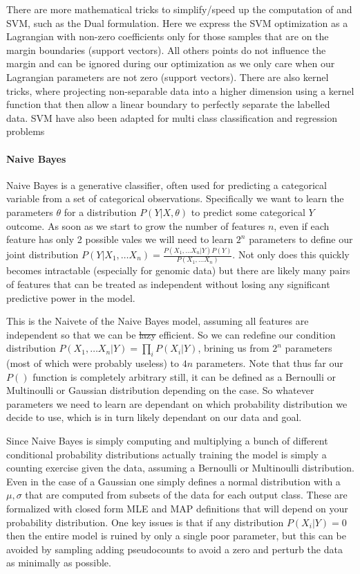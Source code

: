 There are more mathematical tricks to simplify/speed up the computation of and SVM, such as the Dual formulation.
Here we express the SVM optimization as a Lagrangian with non-zero coefficients only for those samples that are on the margin boundaries (support vectors).
All others points do not influence the margin and can be ignored during our optimization as we only care when our Lagrangian parameters are not zero (support vectors).
There are also kernel tricks, where projecting non-separable data into a higher dimension using a kernel function that then allow a linear boundary to perfectly separate the labelled data.
SVM have also been adapted for multi class classification and regression problems

\paragraph{Naive Bayes}
Naive Bayes is a generative classifier, often used for predicting a categorical variable from a set of categorical observations.
Specifically we want to learn the parameters $\theta$ for a distribution $P(Y|X,\theta)$ to predict some categorical $Y$ outcome.
As soon as we start to grow the number of features $n$, even if each feature has only 2 possible vales we will need to learn $2^n$ parameters to define our joint distribution $P(Y|X_1,\dots X_n) = \frac{P(X_1,\dots X_n|Y)P(Y)}{P(X_1,\dots X_n)}$.
Not only does this quickly becomes intractable (especially for genomic data) but there are likely many pairs of features that can be treated as independent without losing any significant predictive power in the model.

This is the Naivete of the Naive Bayes model, assuming all features are independent so that we can be \st{lazy} efficient.
So we can redefine our condition distribution $P(X_1,\dots X_n|Y) = \prod_i P(X_i|Y)$, brining us from $2^n$ parameters (most of which were probably useless) to $4n$ parameters.
Note that thus far our $P()$ function is completely arbitrary still, it can be defined as a Bernoulli or Multinoulli or Gaussian distribution depending on the case.
So whatever parameters we need to learn are dependant on which probability distribution we decide to use, which is in turn likely dependant on our data and goal.

Since Naive Bayes is simply computing and multiplying a bunch of different conditional probability distributions actually training the model is simply a counting exercise given the data, assuming a Bernoulli or Multinoulli distribution.
Even in the case of a Gaussian one simply defines a normal distribution with a $\mu,\sigma$ that are computed from subsets of the data for each output class.
These are formalized with closed form MLE and MAP definitions that will depend on your probability distribution.
One key issues is that if any distribution $P(X_i|Y) = 0$ then the entire model is ruined by only a single poor parameter, but this can be avoided by sampling adding pseudocounts to avoid a zero and perturb the data as minimally as possible.


